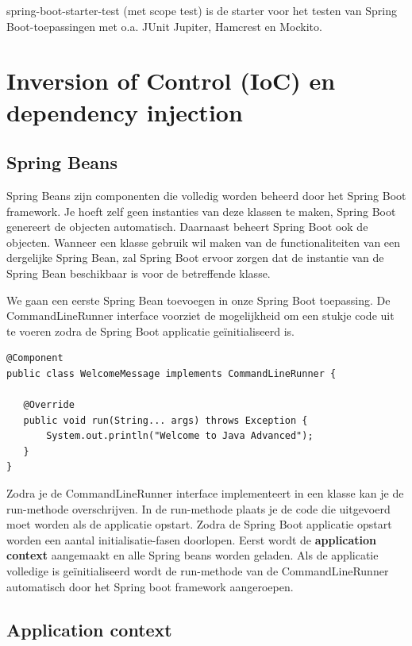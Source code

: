 spring-boot-starter-test (met scope test) is de starter voor het testen van Spring Boot-toepassingen met o.a. JUnit Jupiter, Hamcrest en Mockito.

\section{Inversion of Control (IoC) en dependency injection}

\subsection{Spring Beans}

Spring Beans zijn componenten die volledig worden beheerd door het Spring Boot framework. Je hoeft zelf geen instanties van deze klassen te maken, Spring Boot genereert de objecten automatisch.  Daarnaast beheert Spring Boot ook de objecten. Wanneer een klasse gebruik wil maken van de functionaliteiten van een dergelijke Spring Bean, zal Spring Boot ervoor zorgen dat de instantie van de Spring Bean beschikbaar is voor de betreffende klasse.

We gaan een eerste Spring Bean toevoegen in onze Spring Boot toepassing.
De CommandLineRunner interface voorziet de mogelijkheid om een stukje code uit te voeren zodra de Spring Boot applicatie ge\"initialiseerd is. 

\begin{lstlisting}
@Component
public class WelcomeMessage implements CommandLineRunner {
   
   @Override    
   public void run(String... args) throws Exception {
	   System.out.println("Welcome to Java Advanced");
   }
}
\end{lstlisting}


Zodra je de CommandLineRunner interface implementeert in een klasse kan je de run-methode overschrijven. In de run-methode plaats je de code die uitgevoerd moet worden
als de applicatie opstart.  Zodra de Spring Boot applicatie opstart worden een aantal initialisatie-fasen doorlopen.  Eerst wordt de \textbf{application context} aangemaakt en alle Spring beans worden geladen. Als de applicatie volledige is ge\"initialiseerd wordt de run-methode van de CommandLineRunner automatisch door het Spring boot framework aangeroepen.


\subsection{Application context}

